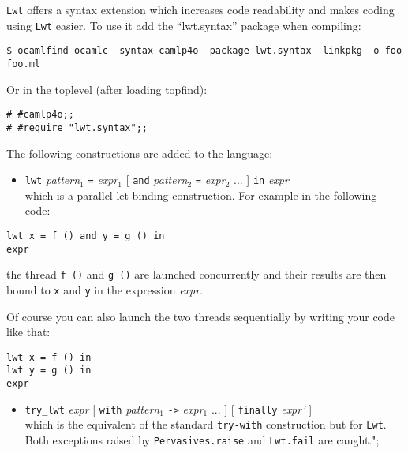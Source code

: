 {\tt Lwt} offers a syntax extension which increases code readability and
makes coding using {\tt Lwt} easier.  To use it add the ``lwt.syntax'' package when
compiling:



\lstset{language=[Objective]Caml}\begin{lstlisting}
$ ocamlfind ocamlc -syntax camlp4o -package lwt.syntax -linkpkg -o foo foo.ml
\end{lstlisting}
\medskip

\noindent
Or in the toplevel (after loading topfind):



\lstset{language=[Objective]Caml}\begin{lstlisting}
# #camlp4o;;
# #require "lwt.syntax";;
\end{lstlisting}
\medskip

\noindent
The following constructions are added to the language:



\begin{itemize}
\item  {\tt lwt} \emph{pattern$_{\mbox{1}}$} {\tt =} \emph{expr$_{\mbox{1}}$} [ {\tt and}
\emph{pattern$_{\mbox{2}}$} {\tt =} \emph{expr$_{\mbox{2}}$} ... ] {\tt in} \emph{expr}
\mbox{}\\
which is a parallel let-binding construction. For example in the
following code:

\end{itemize}

\lstset{language=[Objective]Caml}\begin{lstlisting}
lwt x = f () and y = g () in
expr
\end{lstlisting}
\medskip

\noindent
the thread {\tt f ()} and {\tt g ()} are launched concurrently
and their results are then bound to {\tt x} and {\tt y} in the
expression \emph{expr}.



Of course you can also launch the two threads sequentially by
writing your code like that:



\lstset{language=[Objective]Caml}\begin{lstlisting}
lwt x = f () in
lwt y = g () in
expr
\end{lstlisting}
\medskip

\noindent
\begin{itemize}
\item  {\tt try\_lwt} \emph{expr} [ {\tt with} \emph{pattern$_{\mbox{1}}$}
{\tt ->} \emph{expr$_{\mbox{1}}$} ... ] [ {\tt finally} \emph{expr'} ]
\mbox{}\\
which is the equivalent of the standard {\tt try-with}
construction but for {\tt Lwt}. Both exceptions raised by
{\tt Pervasives.raise} and {\tt Lwt.fail} are caught.";

\end{itemize}

